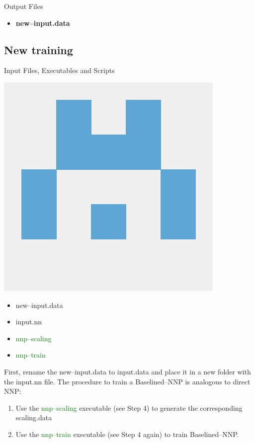 \documentclass[12pt]{article}
\begin{document}
\begin{mybox3}{Output Files}
\begin{itemize}
    \item \textbf{new--input.data}
\end{itemize}
\end{mybox3}
%
\subsection{New training}
\begin{mybox2}{{Input Files, Executables and Scripts}}
\begin{minipage}[c]{0.5\linewidth}
\includegraphics[scale=0.1]{n2p2.png}
\end{minipage}
\begin{minipage}[c]{0.5\linewidth}
\begin{itemize}
    \item new--input.data
    \item input.nn
    \item \textcolor{green}{nnp--scaling}
    \item \textcolor{green}{nnp--train}
\end{itemize}
\end{minipage}
\end{mybox2}
First, rename the new--input.data to input.data and place it in a new folder with the input.nn file. The procedure to train a Baselined--NNP is analogous to direct NNP:
\begin{enumerate}
    \item Use the \textcolor{green}{nnp--scaling} executable (see Step 4) to generate the corresponding scaling.data
    \item Use the \textcolor{green}{nnp--train} executable (see Step 4 again) to train Baselined--NNP. 
\end{enumerate}
\end{document}
